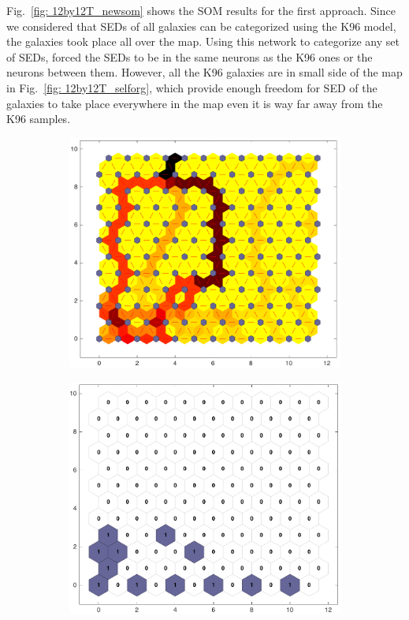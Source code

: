     Fig.~\ref{fig: 12by12T_newsom} shows the SOM results for the first approach. 
    Since we considered that SEDs of all galaxies can be categorized using the K96 model, the galaxies took place all over the map.
    Using this network to categorize any set of SEDs, forced the SEDs to be in the same neurons as the K96 ones or the neurons between them.
    However, all the K96 galaxies are in small side of the map in Fig.~\ref{fig: 12by12T_selforg}, which provide enough freedom for SED of the galaxies to take place everywhere in the map even it is way far away from the K96 samples.
    \begin{figure}
        \begin{subfigure}[b]{0.5\textwidth}
            \centering
            \includegraphics[width=\textwidth]{../images/2d/dist_12_by_self_org_res12.png}
        \end{subfigure}
        \hfill
        \begin{subfigure}[b]{0.5\textwidth}
            \includegraphics[width=\textwidth]{../images/2d/hit_t_12_by_self_org_res12.png}

\end{subfigure}
\end{figure}

